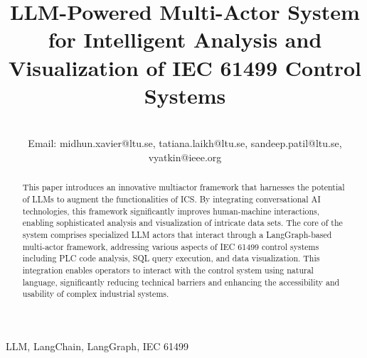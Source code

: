 \documentclass[conference]{IEEEtran}
\begin{document}
\title{LLM-Powered Multi-Actor System for Intelligent Analysis and Visualization of IEC 61499 Control Systems}


\author{








\\ Email: midhun.xavier@ltu.se, tatiana.laikh@ltu.se, sandeep.patil@ltu.se, vyatkin@ieee.org
}

\maketitle

\begin{abstract}


This paper introduces an innovative multiactor framework that harnesses the potential of LLMs to augment the functionalities of ICS. By integrating conversational AI technologies, this framework significantly improves human-machine interactions, enabling sophisticated analysis and visualization of intricate data sets.  The core of the system comprises specialized LLM actors that interact through a LangGraph-based multi-actor framework, addressing various aspects of IEC 61499 control systems including PLC code analysis, SQL query execution, and data visualization. This integration enables operators to interact with the control system using natural language, significantly reducing technical barriers and enhancing the accessibility and usability of complex industrial systems. 

\end{abstract}

\begin{IEEEkeywords}
LLM, LangChain, LangGraph, IEC 61499

\end{IEEEkeywords}
\end{document}
